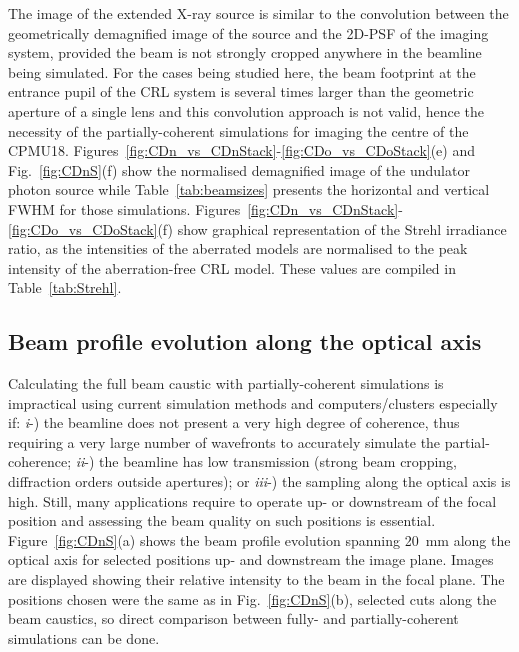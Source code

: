 \begin{refsection}
The image of the extended X-ray source is similar to the convolution between the geometrically demagnified image of the source and the 2D-PSF of the imaging system, provided the beam is not strongly cropped anywhere in the beamline being simulated. For the cases being studied here, the beam footprint at the entrance pupil of the CRL system is several times larger than the geometric aperture of a single lens and this convolution approach is not valid, hence the necessity of the partially-coherent simulations for imaging the centre of the CPMU18. Figures~\ref{fig:CDn_vs_CDnStack}-\ref{fig:CDo_vs_CDoStack}(e) and Fig.~\ref{fig:CDnS}(f) show the normalised demagnified image of the undulator photon source while Table~\ref{tab:beamsizes} presents the horizontal and vertical FWHM for those simulations. Figures~\ref{fig:CDn_vs_CDnStack}-\ref{fig:CDo_vs_CDoStack}(f) show graphical representation of the Strehl irradiance ratio, as the intensities of the aberrated models are normalised to the peak intensity of the aberration-free CRL model. These values are compiled in Table~\ref{tab:Strehl}.

\subsection{Beam profile evolution along the optical axis}\label{sec:partcaustics_sim}

Calculating the full beam caustic with partially-coherent simulations is impractical using current simulation methods and computers/clusters especially if: \textit{i}-)  the beamline does not present a very high degree of coherence, thus requiring a very large number of wavefronts to accurately simulate the partial-coherence; \textit{ii}-) the beamline has low transmission (strong beam cropping, diffraction orders outside apertures); or \textit{iii}-) the sampling along the optical axis is high. Still, many applications require to operate up- or downstream of the focal position and assessing the beam quality on such positions is essential. Figure~\ref{fig:CDnS}(a) shows the beam profile evolution spanning 20~mm along the optical axis for selected positions up- and downstream the image plane. Images are displayed showing their relative intensity to the beam in the focal plane. The positions chosen were the same as in Fig.~\ref{fig:CDnS}(b), selected cuts along the beam caustics, so direct comparison between fully- and partially-coherent simulations can be done.


\end{refsection}

